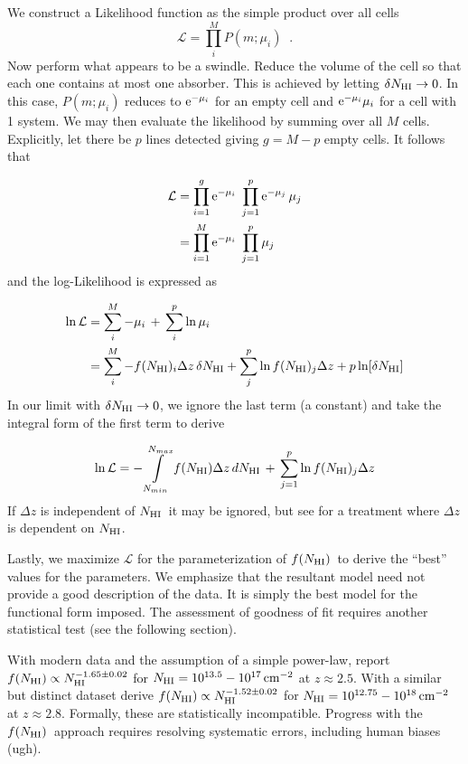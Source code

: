 \documentclass[graybox]{svmult}
\def\smm{\sum\limits}
\def\intl{\int\limits}
\newcommand{\mnhi}{N_{\rm HI}}
\newcommand{\nhi}{$\mnhi$}
\def\cm#1{\, {\rm cm^{#1}}}
\def\mfnhi{f(\mnhi)}
\def\fnhi{$\mfnhi$}
\def\prodl{\prod\limits}
\begin{document}
We construct a Likelihood function as the 
simple product over all cells
\begin{equation}
\mathcal{L} = \prodl_i^M P(m; \mu_i) \;\; .
\end{equation}
Now perform what appears to be a swindle.
Reduce the volume of the cell so that each one contains
at most one absorber.  This is achieved by letting
$\delta\mnhi \to 0$.
In this case, $P(m;\mu_i)$ reduces to ${\rm e}^{-\mu_i}$ for an
empty cell and ${\rm e}^{-\mu_i} \mu_i$ for a cell with 1 system.
We may then evaluate the likelihood
by summing over all $M$ cells.  Explicitly,  
let there be $p$ lines detected giving $g=M-p$ empty cells.
It follows that 

\begin{align}
\mathcal{L} &= \prodl_{i=1}^g {\rm e}^{-\mu_i} \;
\prodl_{j=1}^p {\rm e}^{-\mu_j} \, \mu_j \\
&= \prodl_{i=1}^M {\rm e}^{-\mu_i} \; \prodl_{j=1}^p \mu_j
\end{align}
and the log-Likelihood is expressed as

\begin{align}
\ln \mathcal{L} &= \smm_i^M -\mu_i \, + \, \smm_i^p \ln \mu_i \\
&= \smm_i^M -f(\mnhi)_i \Delta z \, \delta\mnhi +
\smm_j^p \ln f(\mnhi)_j \Delta z + p \ln [\delta\mnhi]
\label{eqn:max_fN}
\end{align}
In our limit with $\delta\mnhi \to 0$,
we ignore the last term (a constant) and take the integral form
of the first term to derive

\begin{equation}
\ln \mathcal{L} = - \intl_{N_{min}}^{N_{max}} f(\mnhi) \Delta z \, d\mnhi 
\, + \, \smm_{j=1}^p \ln f(\mnhi)_j \Delta z
\end{equation}
If $\Delta z$ is independent of \nhi\ it may be ignored,
but see \cite{ctp+10} for a treatment where
$\Delta z$ is dependent on \nhi.

Lastly, we maximize $\mathcal{L}$ for the parameterization of \fnhi\
to derive the ``best'' values for the parameters.
We emphasize that the resultant model need not 
provide a good description of the data.  It is simply the 
best model for the functional form imposed.
The assessment of goodness of fit requires another statistical
test (see the following section).

With modern data and the assumption of a simple
power-law, \cite{rudie13} report
$\mfnhi \propto \mnhi^{-1.65 \pm 0.02}$ for
$\mnhi = 10^{13.5} - 10^{17} \cm{-2}$ at $z \approx 2.5$.
With a similar but distinct dataset 
\cite{kim13} derive
$\mfnhi \propto \mnhi^{-1.52 \pm 0.02}$
for $\mnhi = 10^{12.75} - 10^{18} \cm{-2}$
at $z \approx 2.8$.
Formally, these are statistically incompatible.
Progress with the \fnhi\ approach
requires resolving systematic errors, including
human biases (ugh).
\end{document}

